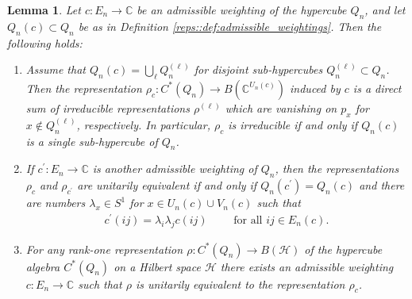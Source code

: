 \documentclass[a4paper]{amsart}
\newcommand{\C}{\mathbb{C}}
\newtheorem{lemma}[thm]{Lemma}
\begin{document}
\begin{lemma}
    \label{hyp::lemma:properties_of_admissible_weightings}
    Let $c: E_n \to \C$ be an admissible weighting of the hypercube $Q_n$, and let $Q_n(c) \subset Q_n$ be as in Definition \ref{reps::def:admissible_weightings}. Then the following holds:
    \begin{enumerate}
        \item Assume that $Q_n(c) = \bigcup_\ell Q_n^{(\ell)}$ for disjoint sub-hypercubes $Q_n^{(\ell)} \subset Q_n$. Then the representation $\rho_c: C^\ast(Q_n) \to B(\C^{U_n(c)})$ induced by $c$ is a direct sum of irreducible representations $\rho^{(\ell)}$ which are vanishing on $p_x$ for $x \not \in Q_n^{(\ell)}$, respectively. In particular, $\rho_c$ is irreducible if and only if $Q_n(c)$ is a single sub-hypercube of $Q_n$.
        \item If $c^\prime: E_n \to \C$ is another admissible weighting of $Q_n$, then the representations $\rho_c$ and $\rho_{c^\prime}$ are unitarily equivalent if and only if $Q_n(c^\prime) = Q_n(c)$ and there are numbers $\lambda_x \in S^1$ for $x \in U_n(c) \cup V_n(c)$ such that
        \begin{align*}
            c^\prime(ij) = \lambda_i \lambda_j c(ij) \qquad \text{ for all } ij \in E_n(c).
        \end{align*}
        \item For any rank-one representation $\rho: C^\ast(Q_n) \to B(\mathcal{H})$ of the hypercube algebra $C^\ast(Q_n)$ on a Hilbert space $\mathcal{H}$ there exists an admissible weighting $c: E_n \to \C$ such that $\rho$ is unitarily equivalent to the representation $\rho_c$.
    \end{enumerate}
\end{lemma}
\end{document}
